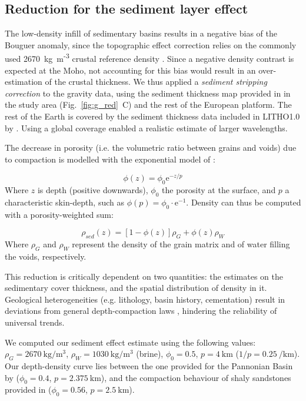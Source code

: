 \subsection{Reduction for the sediment layer effect}
\label{ss:Appl:GravSed}
The low-density infill of sedimentary basins results in a negative bias of the Bouguer anomaly, since the topographic effect correction relies on the commonly used 2670~{kg~m\textsuperscript{-3}} crustal reference density \parencite{Hinze2003}.
Since a negative density contrast is expected at the Moho, not accounting for this bias would result in an over-estimation of the crustal thickness.
We thus applied a \textit{sediment stripping correction} \parencite{Chen2014} to the gravity data, using the sediment thickness map provided in \textcite{Tesauro2008} in the study area (Fig.~\ref{fig:g_red}~C) and the rest of the European platform.
The rest of the Earth is covered by the sediment thickness data included in {LITHO1.0} by \textcite{Pasyanos2014}.
Using a global coverage enabled a realistic estimate of larger wavelengths.

The decrease in porosity (i.e. the volumetric ratio between grains and voids) due to compaction is modelled with the exponential model of \textcite{woodside1961}:

\begin{equation}
	\label{eq:ExpCompactionPhi}
	\phi(z) = \phi_0 \mathrm{e}^{-z/p}
\end{equation}
Where $z$ is depth (positive downwards), $\phi_0$ the porosity at the surface, and $p$ a characteristic skin-depth, such as $\phi(p) = \phi_0 \cdot \mathrm{e}^{-1}$.
Density can thus be computed with a porosity-weighted sum:

\begin{equation}
	\label{eq:ExpCompactionRho}
	\rho_{sed}(z) = [1-\phi(z)] \rho_{G} + \phi(z) \rho_{W}
\end{equation}
Where $\rho_{G}$ and $\rho_{W}$ represent the density of the grain matrix and of water filling the voids, respectively.

This reduction is critically dependent on two quantities: the estimates on the sedimentary cover thickness, and the spatial distribution of density in it.
Geological heterogeneities (e.g. lithology, basin history, cementation) result in deviations from general depth-compaction laws \parencite{allen2013basin}, hindering the reliability of universal trends.

We computed our sediment effect estimate using the following values: $\rho_G = \SI{2670}{\kilo \gram \per \cubic \metre}$, $\rho_W = \SI{1030}{\kilo \gram \per \cubic \metre}$ (brine), $\phi_0 = \num{0.5}$, $p = \SI{4}{\kilo \metre}$ ($1/p = \SI{0.25}{\per \kilo \metre}$).
Our depth-density curve lies between the one provided for the Pannonian Basin by \textcite{Kaban2010} ($\phi_0 = \num{0.4}$, $p = \SI{2.375}{\kilo \metre}$), and the compaction behaviour of shaly sandstones provided in \parencite{allen2013basin} ($\phi_0 = \num{0.56}$, $p = \SI{2.5}{\kilo \metre}$).


